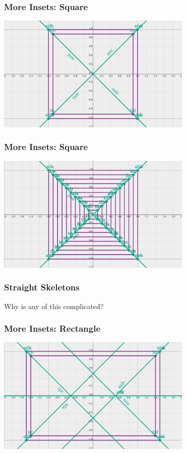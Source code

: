 \documentclass[hyperref={pdfpagemode=FullScreen},aspectratio=169]{beamer}
\begin{document}
\begin{frame}
  \frametitle{More Insets: Square}
    \includegraphics[width=0.7\textwidth, center]{square-Straight_Skeleton_and_Inset.png}
\end{frame}

\begin{frame}
  \frametitle{More Insets: Square}
    \includegraphics[width=0.7\textwidth, center]{square-Straight_Skeleton_and_Insets.png}
\end{frame}

\begin{frame}
  \frametitle{Straight Skeletons}
  \Huge{\centerline{Why is any of this complicated?}}
\end{frame}

\begin{frame}
  \frametitle{More Insets: Rectangle}
  \includegraphics[width=0.7\textwidth, center]{rectangle-Straight_Skeleton_and_Inset.png}
\end{frame}
\end{document}
